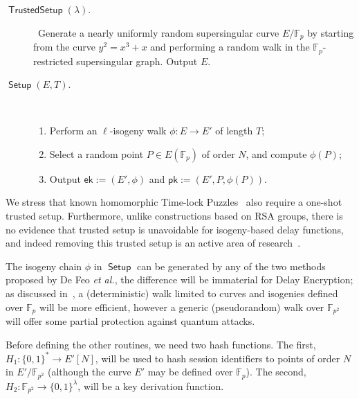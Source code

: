 \documentclass{llncs}
\newcommand{\F}{\mathbb{F}}
\DeclareMathOperator{\Setup}{\mathsf{Setup}}
\DeclareMathOperator{\TSetup}{\mathsf{TrustedSetup}}
\newcommand{\ek}{\mathsf{ek}}
\newcommand{\pk}{\mathsf{pk}}
\begin{document}
\begin{description}
\item[$\TSetup(\lambda)$.]\
  Generate a nearly uniformly random supersingular curve
  $E/\F_p$ by starting from the curve $y^2=x^3+x$ and performing a
  random walk in the $\F_p$-restricted supersingular graph. %
  Output $E$.
\item[$\Setup(E,T)$.]\
  \begin{enumerate}
  \item Perform an $\ell$-isogeny walk $\phi:E\to E'$ of length $T$;
  \item Select a random point $P\in E(\F_p)$ of order $N$, and compute
    $\phi(P)$;
  \item Output $\ek:=(E',\phi)$ and $\pk:=(E',P,\phi(P))$.
  \end{enumerate}
\end{description}

We stress that known homomorphic Time-lock Puzzles~\cite{C:MalThy19}
also require a one-shot trusted setup. %
Furthermore, unlike constructions based on RSA groups,
there is no evidence that trusted setup is unavoidable for
isogeny-based delay functions, and indeed removing this trusted setup
is an active area of
research~\cite{10.1007/978-3-030-45724-2_18,love2019supersingular}.

The isogeny chain $\phi$ in $\Setup$ can be generated by any of the
two methods proposed by De Feo \emph{et al.}, the difference will be
immaterial for Delay Encryption; as discussed
in~\cite{10.1007/978-3-030-34578-5_10}, a (deterministic) walk limited
to curves and isogenies defined over $\F_p$ will be more efficient,
however a generic (pseudorandom) walk over $\F_{p^2}$ will offer some
partial protection against quantum attacks.

Before defining the other routines, we need two hash functions. %
The first, $H_1:\{0,1\}^*\to E'[N]$, will be used to hash session
identifiers to points of order $N$ in $E'/\F_{p^2}$ (although the
curve $E'$ may be defined over $\F_p$). %
The second, $H_2:\F_{p^2}\to\{0,1\}^\lambda$, will be a key derivation
function. %
\end{document}
